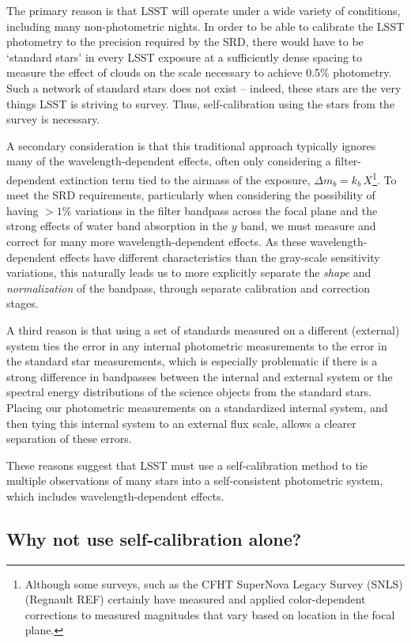 \documentclass[12pt,preprint]{aastex}
\begin{document}
The primary reason is that LSST will operate under a wide variety of
conditions, including many non-photometric nights. In order to be able
to calibrate the LSST photometry to the precision required by the SRD,
there would have to be `standard stars' in every LSST exposure at a
sufficiently dense spacing to measure the effect of clouds on the
scale necessary to achieve 0.5\% photometry. Such a network of
standard stars does not exist -- indeed, these stars are the very
things LSST is striving to survey. Thus, self-calibration using the
stars from the survey is necessary. 

A secondary consideration is that this traditional approach typically
ignores many of the wavelength-dependent effects, often only
considering a filter-dependent extinction term tied to the airmass of
the exposure, $\Delta m_b = k_b\,X$\footnote{Although some surveys,
such as the CFHT SuperNova Legacy Survey (SNLS) (Regnault REF)
certainly have measured and applied color-dependent corrections to
measured magnitudes that vary based on location in the focal plane.}.
To meet the SRD requirements, particularly when considering the
possibility of having $>1\%$ variations in the filter bandpass across the
focal plane and the strong effects of water band absorption in the $y$
band, we must measure and correct for many more wavelength-dependent
effects. As these wavelength-dependent effects have different
characteristics than the gray-scale sensitivity variations, this
naturally leads us to more explicitly separate the {\it shape} and {\it
normalization} of the bandpass, through separate calibration and
correction stages. 

A third reason is that using a set of standards measured on a
different (external) system ties the error in any internal photometric
measurements to the error in the standard star measurements, which is
especially problematic if there is a strong difference in bandpasses
between the internal and external system or the spectral energy
distributions of the science objects from the standard
stars. Placing our photometric measurements on a standardized internal
system, and then tying this internal system to an external flux scale,
allows a clearer separation of these errors. 

These reasons suggest that LSST must use a self-calibration method to
tie multiple observations of many stars into a self-consistent
photometric system, which includes wavelength-dependent effects. 

\subsection{Why not use self-calibration alone?}
\end{document}
